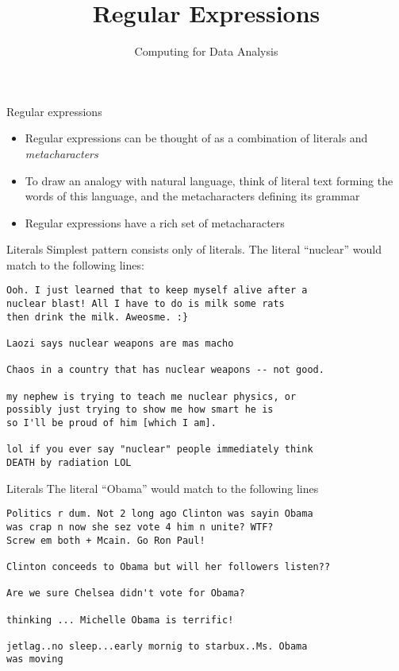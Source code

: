 \documentclass[aspectratio=169]{beamer}
\title{Regular Expressions}
\date{Computing for Data Analysis}
\begin{document}
\begin{frame}
  \titlepage
\end{frame}

\begin{frame}{Regular expressions}
\begin{itemize}
\item
Regular expressions can be thought of as a combination of literals and
\textit{metacharacters}
\item
To draw an analogy with natural language, think of literal text
forming the words of this language, and the metacharacters defining
its grammar
\item
Regular expressions have a rich set of metacharacters
\end{itemize}

\end{frame}

\begin{frame}[fragile]{Literals}
Simplest pattern consists only of literals.  The literal ``nuclear''
would match to the following lines:
\begin{verbatim}
Ooh. I just learned that to keep myself alive after a 
nuclear blast! All I have to do is milk some rats 
then drink the milk. Aweosme. :}

Laozi says nuclear weapons are mas macho

Chaos in a country that has nuclear weapons -- not good.

my nephew is trying to teach me nuclear physics, or 
possibly just trying to show me how smart he is 
so I'll be proud of him [which I am].

lol if you ever say "nuclear" people immediately think 
DEATH by radiation LOL
\end{verbatim}
\end{frame}

\begin{frame}[fragile]{Literals}
The literal ``Obama'' would match to the following lines
\begin{verbatim}
Politics r dum. Not 2 long ago Clinton was sayin Obama 
was crap n now she sez vote 4 him n unite? WTF? 
Screw em both + Mcain. Go Ron Paul!

Clinton conceeds to Obama but will her followers listen??  

Are we sure Chelsea didn't vote for Obama?

thinking ... Michelle Obama is terrific!

jetlag..no sleep...early mornig to starbux..Ms. Obama 
was moving
\end{verbatim}
\end{frame}
\end{document}
